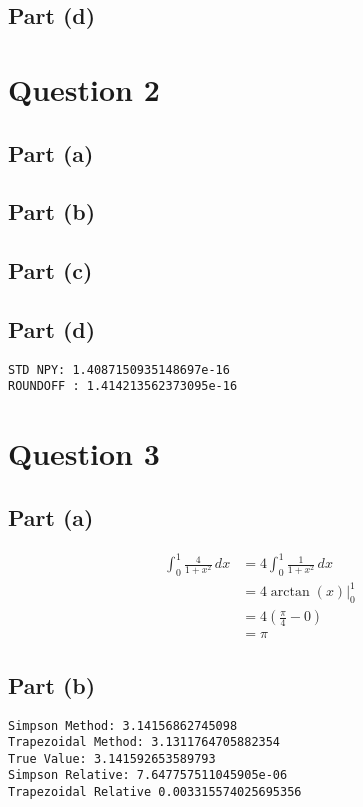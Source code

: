 \documentclass[reprint, amsmath,amssymb, aps]{revtex4-2}
\begin{document}

    \subsection{Part (d)}



\section{Question 2}
\subsection{Part (a)}
\subsection{Part (b)}
\subsection{Part (c)}
\subsection{Part (d)}
\begin{lstlisting}[style=console]
STD NPY: 1.4087150935148697e-16
ROUNDOFF : 1.414213562373095e-16
\end{lstlisting}

\section{Question 3}
\subsection{Part (a)}
    \begin{align*}
        \int_{0}^{1} \frac{4}{1 + x^2}\,dx &= 4 \int_{0}^{1} \frac{1}{1 + x^2}\,dx \\
        &= 4 \arctan(x) \Big|_{0}^{1} \\
        &= 4 (\frac{\pi}{4} - 0) \\
        &= \pi
    \end{align*}
\subsection{Part (b)}
\begin{lstlisting}[style=console]
Simpson Method: 3.14156862745098
Trapezoidal Method: 3.1311764705882354
True Value: 3.141592653589793
Simpson Relative: 7.647757511045905e-06
Trapezoidal Relative 0.003315574025695356
\end{lstlisting}
\end{document}
